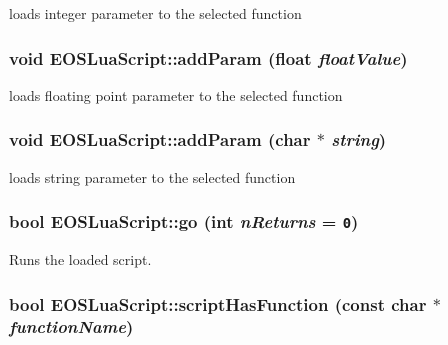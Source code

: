 loads integer parameter to the selected function 

\hypertarget{classEOSLuaScript_1a6ac1c2783c000b1cf57b3a09c04cfc}{
\subsubsection[{addParam}]{\setlength{\rightskip}{0pt plus 5cm}void EOSLuaScript::addParam (float {\em floatValue})}}
\label{classEOSLuaScript_1a6ac1c2783c000b1cf57b3a09c04cfc}


loads floating point parameter to the selected function 

\hypertarget{classEOSLuaScript_9a6e58cbb890391a8eb34cf22a0e7cfd}{
\subsubsection[{addParam}]{\setlength{\rightskip}{0pt plus 5cm}void EOSLuaScript::addParam (char $\ast$ {\em string})}}
\label{classEOSLuaScript_9a6e58cbb890391a8eb34cf22a0e7cfd}


loads string parameter to the selected function 

\hypertarget{classEOSLuaScript_6d24519473b5a583d3ce89252a11e0ce}{
\subsubsection[{go}]{\setlength{\rightskip}{0pt plus 5cm}bool EOSLuaScript::go (int {\em nReturns} = {\tt 0})}}
\label{classEOSLuaScript_6d24519473b5a583d3ce89252a11e0ce}


Runs the loaded script. 

\hypertarget{classEOSLuaScript_466d88c9afeec258536cd069b811f325}{
\subsubsection[{scriptHasFunction}]{\setlength{\rightskip}{0pt plus 5cm}bool EOSLuaScript::scriptHasFunction (const char $\ast$ {\em functionName})}}
\label{classEOSLuaScript_466d88c9afeec258536cd069b811f325}


